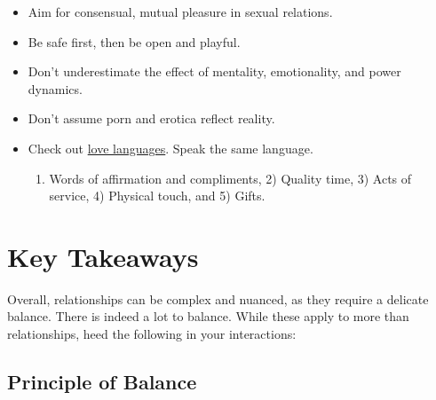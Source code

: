 \documentclass[
]{book}
\providecommand{\tightlist}{%
  \setlength{\itemsep}{0pt}\setlength{\parskip}{0pt}}
\begin{document}
\begin{itemize}
\tightlist
\item
  Aim for consensual, mutual pleasure in sexual relations.
\item
  Be safe first, then be open and playful.
\item
  Don't underestimate the effect of mentality, emotionality, and power dynamics.
\item
  Don't assume porn and erotica reflect reality.
\item
  Check out \href{https://en.wikipedia.org/wiki/The_Five_Love_Languages}{love languages}. Speak the same language.

  \begin{enumerate}
  \def\labelenumi{\arabic{enumi})}
  \tightlist
  \item
    Words of affirmation and compliments, 2) Quality time, 3) Acts of service, 4) Physical touch, and 5) Gifts.
  \end{enumerate}
\end{itemize}

\hypertarget{key-takeaways}{%
\section{Key Takeaways}\label{key-takeaways}}

Overall, relationships can be complex and nuanced, as they require a delicate balance. There is indeed a lot to balance. While these apply to more than relationships, heed the following in your interactions:

\hypertarget{principle-of-balance}{%
\subsection{Principle of Balance}\label{principle-of-balance}}
\end{document}
